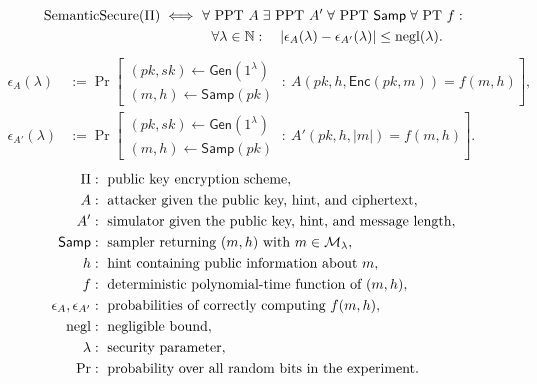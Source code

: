 \documentclass[12pt,a4paper]{article}
\begin{document}
\begin{definition}
\[
\begin{aligned}
\mathrm{SemanticSecure}(\Pi)\iff
&\ \forall\text{ PPT }A\;\exists\text{ PPT }A'
\;\forall\text{ PPT }\mathsf{Samp}\;\forall\text{ PT }f:\\
&\quad \forall\lambda\in\mathbb{N}:\quad
|\epsilon_A(\lambda)-\epsilon_{A'}(\lambda)|\leq\operatorname{negl}(\lambda).
\end{aligned}
\]
\[
\begin{aligned}
\epsilon_A(\lambda)&:=\Pr\!\left[
\begin{array}{l}
(pk,sk)\leftarrow\mathsf{Gen}(1^\lambda)\\
(m,h)\leftarrow\mathsf{Samp}(pk)
\end{array}
\ :\ A(pk,h,\mathsf{Enc}(pk,m))=f(m,h)
\right],\\[5pt]
\epsilon_{A'}(\lambda)&:=\Pr\!\left[
\begin{array}{l}
(pk,sk)\leftarrow\mathsf{Gen}(1^\lambda)\\
(m,h)\leftarrow\mathsf{Samp}(pk)
\end{array}
\ :\ A'(pk,h,|m|)=f(m,h)
\right].
\end{aligned}
\]
\[
\begin{aligned}
\Pi&:\text{ public key encryption scheme},\\
A&:\text{ attacker given the public key, hint, and ciphertext},\\
A'&:\text{ simulator given the public key, hint, and message length},\\
\mathsf{Samp}&:\text{ sampler returning }(m,h)\text{ with }m\in\mathcal{M}_\lambda,\\
h&:\text{ hint containing public information about }m,\\
f&:\text{ deterministic polynomial-time function of }(m,h),\\
\epsilon_A,\epsilon_{A'}&:\text{ probabilities of correctly computing }f(m,h),\\
\operatorname{negl}&:\text{ negligible bound},\\
\lambda&:\text{ security parameter},\\
\Pr&:\text{ probability over all random bits in the experiment}.
\end{aligned}
\]
\end{definition}
\end{document}
